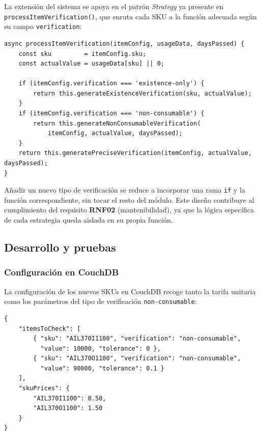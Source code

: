 La extensión del sistema se apoya en el patrón \textit{Strategy} ya presente en \texttt{processItemVerification()}, que enruta cada SKU a la función adecuada según su campo \texttt{verification}:

\begin{lstlisting}[caption=Dispatcher de tipos de verificación en el módulo utilization, label=lst:dispatcher-verif]
async processItemVerification(itemConfig, usageData, daysPassed) {
    const sku         = itemConfig.sku;
    const actualValue = usageData[sku] || 0;

    if (itemConfig.verification === 'existence-only') {
        return this.generateExistenceVerification(sku, actualValue);
    }
    if (itemConfig.verification === 'non-consumable') {
        return this.generateNonConsumableVerification(
            itemConfig, actualValue, daysPassed);
    }
    return this.generatePreciseVerification(itemConfig, actualValue, daysPassed);
}
\end{lstlisting}

Añadir un nuevo tipo de verificación se reduce a incorporar una rama \texttt{if} y la función correspondiente, sin tocar el resto del módulo. Este diseño contribuye al cumplimiento del requisito \textbf{RNF02} (mantenibilidad), ya que la lógica específica de cada estrategia queda aislada en su propia función.


\subsection{Desarrollo y pruebas}

\subsubsection{Configuración en CouchDB}

La configuración de los nuevos SKUs en CouchDB recoge tanto la tarifa unitaria como los parámetros del tipo de verificación \texttt{non-consumable}:

\begin{lstlisting}[caption=Configuración de los SKUs de IA para la validación de factura, label=lst:ai-invoice-config]
{
    "itemsToCheck": [
        { "sku": "AIL370I1100", "verification": "non-consumable",
          "value": 10000, "tolerance": 0 },
        { "sku": "AIL370O1100", "verification": "non-consumable",
          "value": 90000, "tolerance": 0.1 }
    ],
    "skuPrices": {
        "AIL370I1100": 0.50,
        "AIL370O1100": 1.50
    }
}
\end{lstlisting}


